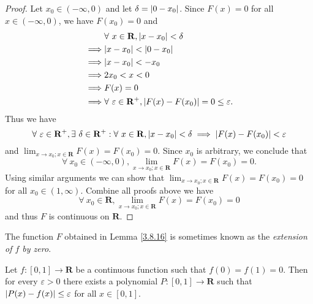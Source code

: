 \begin{proof}
    Let \(x_0 \in (-\infty, 0)\) and let \(\delta = \abs*{0 - x_0}\).
    Since \(F(x) = 0\) for all \(x \in (-\infty, 0)\), we have \(F(x_0) = 0\) and
    \begin{align*}
                 & \forall\ x \in \mathbf{R}, \abs*{x - x_0} < \delta                                \\
        \implies & \abs*{x - x_0} < \abs*{0 - x_0}                                                   \\
        \implies & \abs*{x - x_0} < -x_0                                                             \\
        \implies & 2x_0 < x < 0                                                                      \\
        \implies & F(x) = 0                                                                          \\
        \implies & \forall\ \varepsilon \in \mathbf{R}^+, \abs*{F(x) - F(x_0)} = 0 \leq \varepsilon.
    \end{align*}
    Thus we have
    \[
        \forall\ \varepsilon \in \mathbf{R}^+, \exists\ \delta \in \mathbf{R}^+ : \forall\ x \in \mathbf{R}, \abs*{x - x_0} < \delta \implies \abs*{F(x) - F(x_0)} < \varepsilon
    \]
    and \(\lim_{x \to x_0 ; x \in \mathbf{R}} F(x) = F(x_0) = 0\).
    Since \(x_0\) is arbitrary, we conclude that
    \[
        \forall\ x_0 \in (-\infty, 0), \lim_{x \to x_0 ; x \in \mathbf{R}} F(x) = F(x_0) = 0.
    \]
    Using similar arguments we can show that \(\lim_{x \to x_0 ; x \in \mathbf{R}} F(x) = F(x_0) = 0\) for all \(x_0 \in (1, \infty)\).
    Combine all proofs above we have
    \[
        \forall\ x_0 \in \mathbf{R}, \lim_{x \to x_0 ; x \in \mathbf{R}} F(x) = F(x_0) = 0
    \]
    and thus \(F\) is continuous on \(\mathbf{R}\).
\end{proof}

\begin{remark}\label{3.8.17}
    The function \(F\) obtained in Lemma \ref{3.8.16} is sometimes known as the \emph{extension of \(f\) by zero}.
\end{remark}

\begin{corollary}\label{3.8.18}
    Let \(f : [0, 1] \to \mathbf{R}\) be a continuous function such that \(f(0) = f(1) = 0\).
    Then for every \(\varepsilon > 0\) there exists a polynomial \(P : [0, 1] \to \mathbf{R}\) such that \(\abs*{P(x) - f(x)} \leq \varepsilon\) for all \(x \in [0, 1]\).
\end{corollary}

